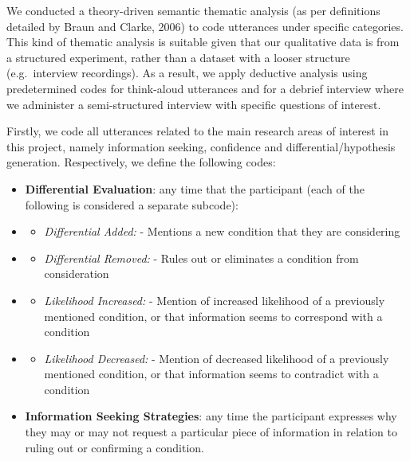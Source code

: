 \documentclass[a4paper, nobind]{templates/ociamthesis}
\providecommand{\tightlist}{%
  \setlength{\itemsep}{0pt}\setlength{\parskip}{0pt}}
\begin{document}
We conducted a theory-driven semantic thematic analysis (as per definitions detailed by Braun and Clarke, 2006) to code utterances under specific categories. This kind of thematic analysis is suitable given that our qualitative data is from a structured experiment, rather than a dataset with a looser structure (e.g.~interview recordings). As a result, we apply deductive analysis using predetermined codes for think-aloud utterances and for a debrief interview where we administer a semi-structured interview with specific questions of interest.

Firstly, we code all utterances related to the main research areas of interest in this project, namely information seeking, confidence and differential/hypothesis generation. Respectively, we define the following codes:

\begin{itemize}
\item
  \textbf{Differential Evaluation}: any time that the participant (each of the following is considered a separate subcode):
\item
  \begin{itemize}
  \tightlist
  \item
    \emph{Differential Added:} - Mentions a new condition that they are considering
  \end{itemize}
\item
  \begin{itemize}
  \tightlist
  \item
    \emph{Differential Removed:} - Rules out or eliminates a condition from consideration
  \end{itemize}
\item
  \begin{itemize}
  \tightlist
  \item
    \emph{Likelihood Increased:} - Mention of increased likelihood of a previously mentioned condition, or that information seems to correspond with a condition
  \end{itemize}
\item
  \begin{itemize}
  \tightlist
  \item
    \emph{Likelihood Decreased:} - Mention of decreased likelihood of a previously mentioned condition, or that information seems to contradict with a condition
  \end{itemize}
\item
  \textbf{Information Seeking Strategies}: any time the participant expresses why they may or may not request a particular piece of information in relation to ruling out or confirming a condition.
\end{itemize}
\end{document}
